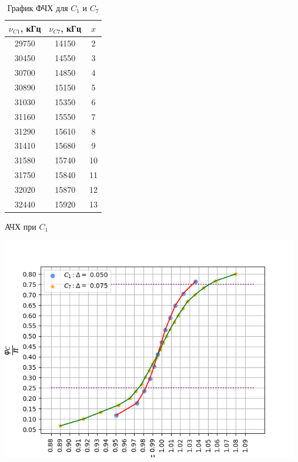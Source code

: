 \begin{table}[h!]
    \begin{minipage}{0.3\linewidth}
        \begin{tabular}{|c|c|c|}
            \hline
            $\nu_{C1}$, кГц & $\nu_{C7}$, кГц  & $x$\\\hline
            29750 & 14150 & 2   \\\hline
            30450 & 14550 & 3   \\\hline
            30700 & 14850 & 4   \\\hline
            30890 & 15150 & 5   \\\hline
            31030 & 15350 & 6   \\\hline
            31160 & 15550 & 7   \\\hline
            31290 & 15610 & 8   \\\hline
            31410 & 15680 & 9   \\\hline
            31580 & 15740 & 10  \\\hline
            31750 & 15840 & 11  \\\hline
            32020 & 15870 & 12  \\\hline
            32440 & 15920 & 13  \\\hline
        \end{tabular}
        \caption{АЧХ при $C_1$}
    \end{minipage}
    \begin{minipage}{0.7\textwidth}
        \centering
        \includegraphics[width=13cm]{./images/plot3.png}
        \caption*{График ФЧХ для $C_1$ и $C_7$}
    \end{minipage}
\end{table} 

